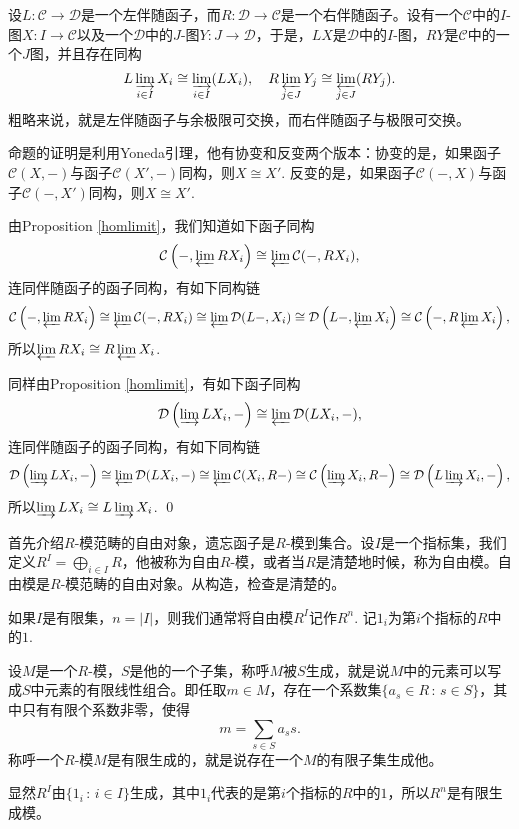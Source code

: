 \pro 设$L:\mathcal{C}\to \mathcal{D}$是一个左伴随函子，而$R:\mathcal{D}\to \mathcal{C}$是一个右伴随函子。设有一个$\mathcal{C}$中的$I$-图$X:I\to \mathcal{C}$以及一个$\mathcal{D}$中的$J$-图$Y:J\to \mathcal{D}$，于是，$LX$是$\mathcal{D}$中的$I$-图，$RY$是$\mathcal{C}$中的一个$J$图，并且存在同构
\[
	L\varinjlim_{i\in I} X_i\cong \varinjlim_{i\in I} (LX_i),\quad
	R\varprojlim_{j\in J} Y_j\cong \varprojlim_{j\in J} (RY_j).
\]
粗略来说，就是左伴随函子与余极限可交换，而右伴随函子与极限可交换。

\proof
	命题的证明是利用Yoneda引理，他有协变和反变两个版本：协变的是，如果函子$\mathcal{C}(X,-)$与函子$\mathcal{C}(X',-)$同构，则$X\cong X'$. 反变的是，如果函子$\mathcal{C}(-,X)$与函子$\mathcal{C}(-,X')$同构，则$X\cong X'$.

	由Proposition \eqref{homlimit}，我们知道如下函子同构
	\[
	\mathcal{C}\left(-,\varprojlim RX_i\right)\cong \varprojlim \mathcal{C}(-,RX_i),
	\]
	连同伴随函子的函子同构，有如下同构链
	\[
	\mathcal{C}\left(-,\varprojlim RX_i\right)\cong \varprojlim \mathcal{C}(-,RX_i)\cong \varprojlim \mathcal{D}(L-,X_i)\cong \mathcal{D}\left(L-,\varprojlim X_i\right)\cong \mathcal{C}\left(-,R\varprojlim X_i\right),
	\]
	所以$\varprojlim RX_i\cong R\varprojlim X_i$.

	同样由Proposition \eqref{homlimit}，有如下函子同构
	\[
	\mathcal{D}\left(\varinjlim LX_i,-\right)\cong \varprojlim \mathcal{D}(LX_i,-),
	\]
	连同伴随函子的函子同构，有如下同构链
	\[
	\mathcal{D}\left(\varinjlim LX_i,-\right)\cong \varprojlim \mathcal{D}(LX_i,-)\cong \varprojlim \mathcal{C}(X_i,R-)\cong \mathcal{C}\left(\varinjlim X_i,R-\right)\cong \mathcal{D}\left(L\varinjlim X_i,-\right),
	\]
	所以$\varinjlim LX_i\cong L\varinjlim X_i$.
\qed

\para 首先介绍$R$-模范畴的自由对象，遗忘函子是$R$-模到集合。设$I$是一个指标集，我们定义$R^I=\bigoplus_{i\in I}R$，他被称为自由$R$-模，或者当$R$是清楚地时候，称为自由模。自由模是$R$-模范畴的自由对象。从构造，检查是清楚的。

如果$I$是有限集，$n=|I|$，则我们通常将自由模$R^I$记作$R^n$. 记$1_i$为第$i$个指标的$R$中的$1$.

\para 设$M$是一个$R$-模，$S$是他的一个子集，称呼$M$被$S$生成，就是说$M$中的元素可以写成$S$中元素的有限线性组合。即任取$m\in M$，存在一个系数集$\{a_s\in R\,:\, s\in S\}$，其中只有有限个系数非零，使得
\[
	m=\sum_{s\in S}a_s s.
\]
称呼一个$R$-模$M$是有限生成的，就是说存在一个$M$的有限子集生成他。

显然$R^I$由$\{1_i\,:\,i\in I\}$生成，其中$1_i$代表的是第$i$个指标的$R$中的$1$，所以$R^n$是有限生成模。

